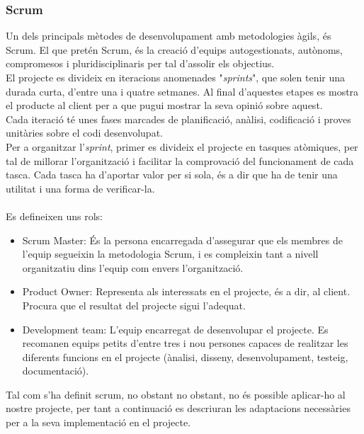 \documentclass[12pt,a4paper,openright,oneside]{article}
\numberwithin{equation}{section}
\theoremstyle{definition}
\begin{document}
\subsubsection*{Scrum}
Un dels principals mètodes de desenvolupament amb metodologies àgils, és Scrum. El que pretén Scrum, és la creació d'equips autogestionats, autònoms, compromesos i pluridisciplinaris per tal d'assolir els objectius.\\
El projecte es divideix en iteracions anomenades "\emph{sprints}", que solen tenir una durada curta, d'entre una i quatre setmanes. Al final d'aquestes etapes es mostra el producte al client per a que pugui mostrar la seva opinió sobre aquest.\\
Cada iteració té unes fases marcades de planificació, anàlisi, codificació i proves unitàries sobre el codi desenvolupat.\\
Per a organitzar l'\emph{sprint}, primer es divideix el projecte en tasques atòmiques, per tal de millorar l'organització i facilitar la comprovació del funcionament de cada tasca. Cada tasca ha d'aportar valor per si sola, és a dir que ha de tenir una utilitat i una forma de verificar-la.\\\\
Es defineixen uns rols:
\begin{itemize}
\item Scrum Master: És la persona encarregada d'assegurar que els membres de l'equip segueixin la metodologia Scrum, i es compleixin tant a nivell organitzatiu dins l'equip com envers l'organització.
\item Product Owner: Representa als interessats en el projecte, és a dir, al client. Procura que el resultat del projecte sigui l'adequat.
\item Development team: L'equip encarregat de desenvolupar el projecte. Es recomanen equips petits d'entre tres i nou persones capaces de realitzar les diferents funcions en el projecte (ànalisi, disseny, desenvolupament, testeig, documentació).
\end{itemize}
Tal com s'ha definit scrum, no obstant no obstant, no és possible aplicar-ho al nostre projecte, per tant a continuació es descriuran les adaptacions necessàries per a la seva implementació en el projecte\cite{scrum}.
\end{document}
